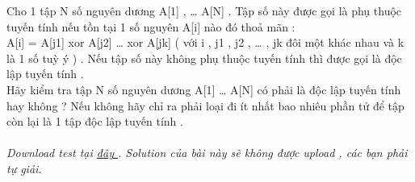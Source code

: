 Cho 1 tập N số nguyên dương A[1] , … A[N] . Tập số này được gọi là phụ thuộc tuyến tính nếu tồn tại 1 số nguyên A[i] nào đó thoả mãn :   
\\   A[i] = A[j1] xor A[j2] … xor A[jk] ( với i , j1 , j2 , … , jk  đôi một khác nhau và k là 1 số tuỳ ý ) . Nếu tập số này không phụ thuộc tuyến tính thì được gọi là độc lập tuyến tính .   
\\   Hãy kiểm tra tập N số nguyên dương A[1] … A[N] có phải là độc lập tuyến tính hay không ? Nếu không hãy chỉ ra phải loại đi ít nhất bao nhiêu phần tử để tập còn lại là 1 tập độc lập tuyến tính .   
\\
\\\textit{    Download test tại    \href{http://vn.spoj.pl/content/XOR.rar}{     đây    }    . Solution của bài này sẽ không được upload , các bạn phải tự giải.   }